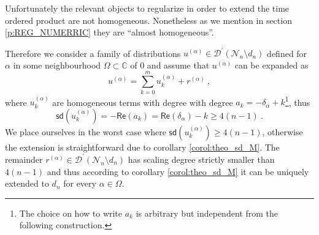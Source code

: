 \documentclass[11pt]{book}
\newcommand{\sd}{\mathsf{sd}}
\renewcommand{\Re}{\mathsf{Re}}
\newcommand{\Dcal}{\mathcal{D}}
\newcommand{\Ncal}{\mathcal{N}}
\newcommand{\Cbb}{\mathbb{C}}
\theoremstyle{break}
\begin{document}
Unfortunately the relevant objects to regularize in order to extend the time ordered product are not homogeneous. Nonetheless as we mention in section \ref{p:REG_NUMERRIC} they are ``almost homogeneous''. 


Therefore we consider a family of distributions $u^{(\alpha)} \in \Dcal^\prime(\Ncal_n\setminus d_n)$ defined for $\alpha$ in some neighbourhood $\Omega \subset \Cbb$ of $0$ and assume that $u^{(\alpha)}$ can be expanded as
%
\begin{equation*}
u^{(\alpha)}  = \sum_{k=0}^m u^{(\alpha)}_k + r^{(\alpha)} \ ,
\end{equation*}
%
where $u^{(\alpha)}_k$ are homogeneous terms with degree with degree $a_k = - \delta_\alpha + k$\footnote{The choice on how to write $a_k$ is arbitrary but independent from the following construction.}, thus 
%
\begin{equation*}
\sd(u^{(\alpha)}_k) = - \Re(a_k)  =\Re\left(\delta_\alpha\right) - k \geq 4(n-1) \ .
\end{equation*}
%
We place ourselves in the worst case where $\sd(u^{(\alpha)}_k) \geq 4(n-1)$, otherwise the extension is straightforward due to corollary \ref{corol:theo_sd_M}. The remainder $r^{(\alpha)}\in \Dcal^\prime(\Ncal_n\setminus d_n)$ has scaling degree strictly smaller than $4(n-1)$ and thus according to corollary \ref{corol:theo_sd_M} it can be uniquely extended to $d_n$ for every $\alpha \in \Omega$.


\bigskip
\end{document}
